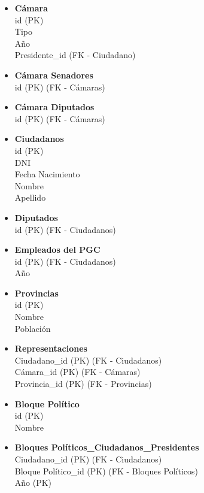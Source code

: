\begin{itemize}
	\item \textbf{Cámara} \\
	id (PK) \\
	Tipo \\
	Año \\
	Presidente\_id (FK - Ciudadano)
	
	\item \textbf{Cámara Senadores} \\
	id (PK) (FK - Cámaras) 
	
	\item \textbf{Cámara Diputados} \\
	id (PK) (FK - Cámaras)
	
	\item \textbf{Ciudadanos} \\
	id (PK) \\
	DNI \\
	Fecha Nacimiento \\
	Nombre \\
	Apellido
	
	\item \textbf{Diputados} \\
	id (PK) (FK - Ciudadanos)
	
	\item \textbf{Empleados del PGC} \\
	id (PK) (FK - Ciudadanos) \\
	Año
	
	\item \textbf{Provincias} \\
	id (PK) \\
	Nombre \\
	Población
	
	\item \textbf{Representaciones} \\
	Ciudadano\_id (PK) (FK - Ciudadanos) \\
	Cámara\_id (PK) (FK - Cámaras) \\
	Provincia\_id (PK) (FK - Provincias) 
		
	\item \textbf{Bloque Político} \\
	id (PK) \\
	Nombre
	
	\item \textbf{Bloques Políticos\_Ciudadanos\_Presidentes} \\
	Ciudadano\_id (PK) (FK - Ciudadanos) \\
	Bloque Político\_id (PK) (FK - Bloques Políticos)\\
	Año (PK)
	

\end{itemize}
